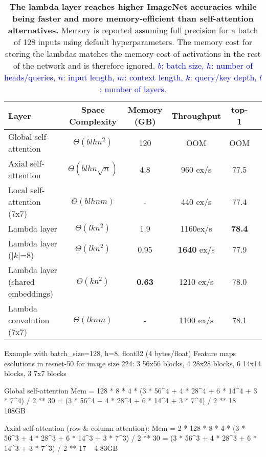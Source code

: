 \documentclass{article} \usepackage{iclr2021_conference,times}
\begin{document}
\begin{table}[h]
  \begin{center}
  \small
  \begin{tabular}{lccccc}
    \toprule
    Layer & Space Complexity & Memory (GB) & Throughput & top-1 \\
    \midrule
    Global self-attention & $\Theta(blhn^2)$ & 120 & OOM & OOM \\
    Axial self-attention & $\Theta(blhn\sqrt{n})$ & 4.8 & 960 ex/s & 77.5 \\
    Local self-attention (7x7) & $\Theta(blhnm)$ & - & 440 ex/s & 77.4 \\ \midrule
    Lambda layer & $\Theta(lkn^2)$ & 1.9 & 1160ex/s & \textbf{78.4} \\
    Lambda layer ($|k|$=8) & $\Theta(lkn^2)$ & 0.95 & \textbf{1640} ex/s & 77.9 \\
    Lambda layer (shared embeddings) & $\Theta(kn^2)$ & \textbf{0.63} & 1210 ex/s & 78.0 \\
    Lambda convolution (7x7) & $\Theta(lknm)$ & - & 1100 ex/s & 78.1 \\
    \bottomrule
  \end{tabular}
  \caption{\textbf{The lambda layer reaches higher ImageNet accuracies while being faster and more memory-efficient than self-attention alternatives.}
  Memory is reported assuming full precision for a batch of 128 inputs using default hyperparameters.
  The memory cost for storing the lambdas matches the memory cost of activations in the rest of the network and is therefore ignored.
  \textcolor{blue}{
  $b$: batch size, $h$: number of heads/queries, $n$: input length, $m$: context length, $k$: query/key depth, $l$: number of layers.}
  }
  \label{tab:memory_comparison}
  \vspace{-0.3cm}
  \end{center}
\end{table}

\iffalse
Example with batch_size=128, h=8, float32 (4 bytes/float)
Feature maps esolutions in resnet-50 for image size 224:
3 56x56 blocks, 4 28x28 blocks, 6 14x14 blocks, 3 7x7 blocks

Global self-attention
Mem = 128 * 8 * 4 * (3 * 56^4 + 4 * 28^4 + 6 * 14^4 + 3 * 7^4) / 2 ** 30
    = (3 * 56^4 + 4 * 28^4 + 6 * 14^4 + 3 * 7^4) / 2 ** 18
    ~ 108GB
  
Axial self-attention (row & column attention): 
Mem = 2 * 128 * 8 * 4 * (3 * 56^3 + 4 * 28^3 + 6 * 14^3 + 3 * 7^3) / 2 ** 30 
    = (3 * 56^3 + 4 * 28^3 + 6 * 14^3 + 3 * 7^3) / 2 ** 17 
    ~ 4.83GB
\end{document}

